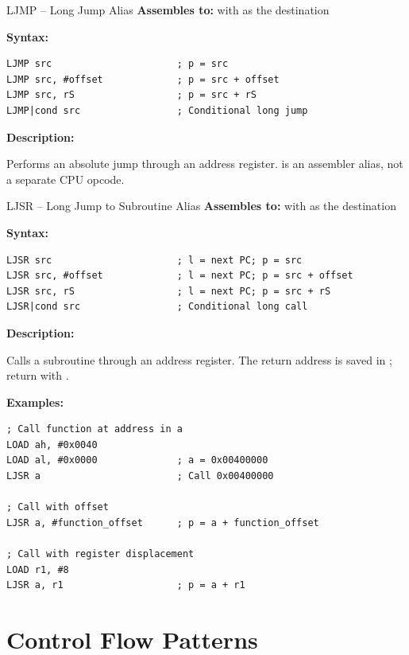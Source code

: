 \begin{instructionbox}{LJMP -- Long Jump Alias}
	\textbf{Assembles to:}  with  as the destination

	\textbf{Syntax:}
	\begin{lstlisting}
LJMP src                      ; p = src
LJMP src, #offset             ; p = src + offset
LJMP src, rS                  ; p = src + rS
LJMP|cond src                 ; Conditional long jump
\end{lstlisting}

	\textbf{Description:}

	Performs an absolute jump through an address register.  is an assembler alias, not a separate CPU
	opcode.

\end{instructionbox}

\begin{instructionbox}{LJSR -- Long Jump to Subroutine Alias}
	\textbf{Assembles to:}  with  as the destination

	\textbf{Syntax:}
	\begin{lstlisting}
LJSR src                      ; l = next PC; p = src
LJSR src, #offset             ; l = next PC; p = src + offset
LJSR src, rS                  ; l = next PC; p = src + rS
LJSR|cond src                 ; Conditional long call
\end{lstlisting}

	\textbf{Description:}

	Calls a subroutine through an address register. The return address is saved in ; return with .

	\textbf{Examples:}
	\begin{lstlisting}
; Call function at address in a
LOAD ah, #0x0040
LOAD al, #0x0000              ; a = 0x00400000
LJSR a                        ; Call 0x00400000

; Call with offset
LJSR a, #function_offset      ; p = a + function_offset

; Call with register displacement
LOAD r1, #8
LJSR a, r1                    ; p = a + r1
\end{lstlisting}

\end{instructionbox}

\section{Control Flow Patterns}

